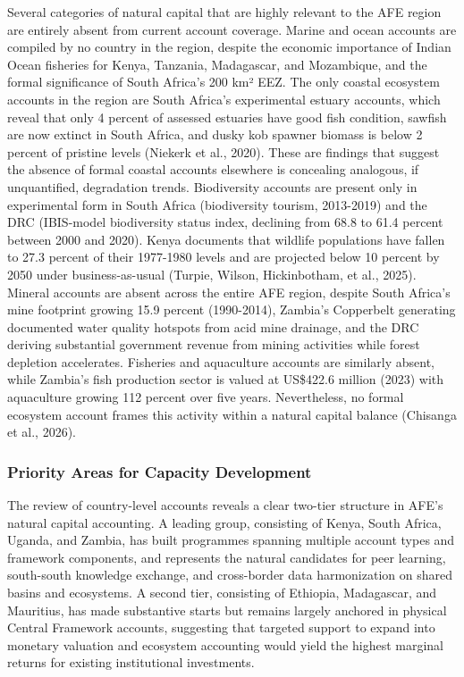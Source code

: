 \documentclass[
  letterpaper,
  DIV=11,
  numbers=noendperiod]{scrartcl}
\begin{document}
Several categories of natural capital that are highly relevant to the
AFE region are entirely absent from current account coverage. Marine and
ocean accounts are compiled by no country in the region, despite the
economic importance of Indian Ocean fisheries for Kenya, Tanzania,
Madagascar, and Mozambique, and the formal significance of South
Africa's 200 km² EEZ. The only coastal ecosystem accounts in the region
are South Africa's experimental estuary accounts, which reveal that only
4 percent of assessed estuaries have good fish condition, sawfish are
now extinct in South Africa, and dusky kob spawner biomass is below 2
percent of pristine levels ({Niekerk et al.}, 2020). These are findings
that suggest the absence of formal coastal accounts elsewhere is
concealing analogous, if unquantified, degradation trends. Biodiversity
accounts are present only in experimental form in South Africa
(biodiversity tourism, 2013-2019) and the DRC (IBIS-model biodiversity
status index, declining from 68.8 to 61.4 percent between 2000 and
2020). Kenya documents that wildlife populations have fallen to 27.3
percent of their 1977-1980 levels and are projected below 10 percent by
2050 under business-as-usual (Turpie, Wilson, Hickinbotham, et al.,
2025). Mineral accounts are absent across the entire AFE region, despite
South Africa's mine footprint growing 15.9 percent (1990-2014), Zambia's
Copperbelt generating documented water quality hotspots from acid mine
drainage, and the DRC deriving substantial government revenue from
mining activities while forest depletion accelerates. Fisheries and
aquaculture accounts are similarly absent, while Zambia's fish
production sector is valued at US\$422.6 million (2023) with aquaculture
growing 112 percent over five years. Nevertheless, no formal ecosystem
account frames this activity within a natural capital balance (Chisanga
et al., 2026).

\subsubsection{Priority Areas for Capacity
Development}\label{priority-areas-for-capacity-development}

The review of country-level accounts reveals a clear two-tier structure
in AFE's natural capital accounting. A leading group, consisting of
Kenya, South Africa, Uganda, and Zambia, has built programmes spanning
multiple account types and framework components, and represents the
natural candidates for peer learning, south-south knowledge exchange,
and cross-border data harmonization on shared basins and ecosystems. A
second tier, consisting of Ethiopia, Madagascar, and Mauritius, has made
substantive starts but remains largely anchored in physical Central
Framework accounts, suggesting that targeted support to expand into
monetary valuation and ecosystem accounting would yield the highest
marginal returns for existing institutional investments.
\end{document}
